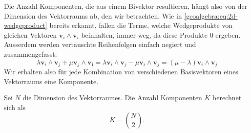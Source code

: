 Die Anzahl Komponenten, die aus einem Bivektor resultieren, hängt also von der Dimension des Vektorraums ab, den wir betrachten.
Wie in \eqref{geoalgebra:eq:2d-wedgeproduct} bereits erkannt, fallen die Terme, welche Wedgeprodukte von gleichen Vektoren $\mathbf{v}_i \wedge \mathbf{v}_i$ beinhalten,
immer weg, da diese Produkte $0$ ergeben. Ausserdem werden vertauschte Reihenfolgen einfach negiert und zusammengefasst: 
\begin{equation}
  \lambda \mathbf{v}_i \wedge \mathbf{v}_j + \mu \mathbf{v}_j \wedge \mathbf{v_i} = \lambda \mathbf{v}_i \wedge \mathbf{v}_j - \mu \mathbf{v}_i \wedge \mathbf{v}_j = (\mu - \lambda) \mathbf{v}_i \wedge \mathbf{v}_j
\end{equation}
Wir erhalten also für jede Kombination von verschiedenen Basisvektoren eines Vektorraums eine Komponente.
\begin{satz}
Sei $N$ die Dimension des Vektorraumes. Die Anzahl Komponenten $K$ berechnet sich als
  \begin{equation}
    \label{geoalgebra:eq:components-bivectors}
    K = \binom{N}{2}.
  \end{equation}
\end{satz}



